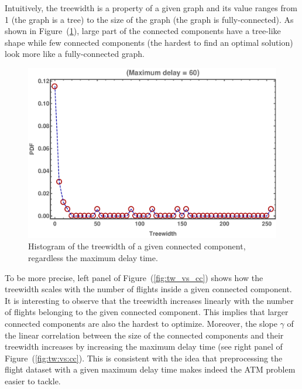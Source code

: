 Intuitively, the treewidth is a property of a given graph and its value ranges
from 1 (the graph is a tree) to the size of the graph (the graph is
fully-connected). As shown in Figure~(\ref{fig:hist_tw}), large part of the
connected components have a tree-like shape while few connected components (the
hardest to find an optimal solution) look more like a fully-connected graph.

\begin{figure}
  \includegraphics[width=\columnwidth]{pics/instances/treewidth_histogram.pdf}
  \caption{\label{fig:hist_tw}Histogram of the treewidth of a given connected
  component, regardless the maximum delay time.}
\end{figure}

To be more precise, left panel of Figure~(\ref{fig:tw_vs_cc}) shows how the
treewidth scales with the number of flights inside a given connected component.
It is interesting to observe that the treewidth increases linearly with the
number of flights belonging to the given connected component. This implies that
larger connected components are also the hardest to optimize. Moreover, the
slope $\gamma$ of the linear correlation between the size of the connected
components and their treewidth increases by increasing the maximum delay time
(see right panel of Figure~(\ref{fig:tw:vs:cc}). This is consistent with the
idea that preprocessing the flight dataset with a given maximum delay time makes
indeed the ATM problem easier to tackle.

